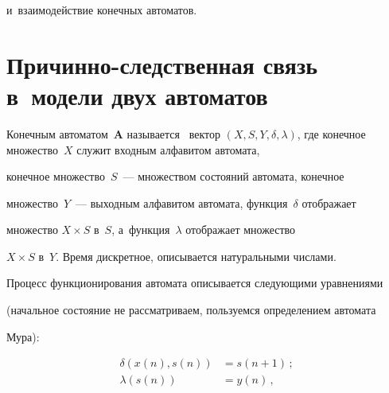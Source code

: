и~взаимодействие конечных автоматов.










\section{Причинно-следственная связь в~модели двух автоматов}










  Конечным автоматом~\textbf{A} называется~\cite{6-gru} вектор $(X, S, Y, \delta, 


\lambda)$, где конечное множество~$X$ служит вход\-ным алфавитом автомата, 


конечное множество~$S$~--- множеством со\-сто\-яний автомата, конечное  


множество~$Y$~--- вы\-ход\-ным алфавитом автомата, функция~$\delta$ отображает 


множество  $X\times S$ в~$S$, а~функция~$\lambda$ отображает множество 


$X\times S$ в~$Y$. Время дискретное,  описывается натуральными числами. 


Процесс функционирования автомата описывается сле\-ду\-ющи\-ми уравнениями 


(начальное со\-сто\-яние не рас\-смат\-ри\-ва\-ем, пользуемся определением автомата 


Мура):





\vspace*{-8pt}





\noindent


  \begin{align*}


  \delta(x(n), s(n)) &= s(n+1)\,;\\


  \lambda(s(n)) &= y(n)\,,


  \end{align*}


